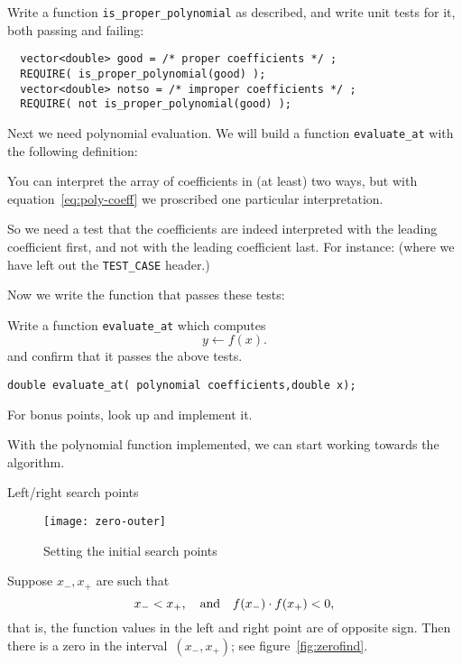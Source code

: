 \begin{exercise}
  \label{ex:proper-poly}
  Write a function \lstinline+is_proper_polynomial+ as described,
  and write unit tests for it, both passing and failing:
\begin{lstlisting}
  vector<double> good = /* proper coefficients */ ;
  REQUIRE( is_proper_polynomial(good) );
  vector<double> notso = /* improper coefficients */ ;
  REQUIRE( not is_proper_polynomial(good) );
\end{lstlisting}
\end{exercise}

Next we need polynomial evaluation.
We will build a function \lstinline{evaluate_at} with the
following definition:

You can interpret the array of coefficients in
(at least) two ways, but with equation~\eqref{eq:poly-coeff}
we proscribed one particular interpretation.

So we need a  test that the coefficients are
indeed interpreted with the leading coefficient first,
and not with the leading coefficient last.
For instance:
%
%
(where we have left out the \lstinline+TEST_CASE+ header.)

Now we write the function that passes these tests:

\begin{exercise}
  \label{ex:bisect-eval}
  Write a function \lstinline+evaluate_at+ which computes
  \[ y \leftarrow f(x) . \]
  and confirm that it passes the above tests.
\begin{lstlisting}
double evaluate_at( polynomial coefficients,double x);
\end{lstlisting}
  For bonus points, look up 
  and implement it.
\end{exercise}

With the polynomial function implemented,
we can start working towards the algorithm.

 {Left/right search points}

\begin{figure}[ht]
  \texttt{[image: zero-outer]}
  \caption{Setting the initial search points}
  \label{fig:zero-outer}
\end{figure}

Suppose $x_-,x_+$ are such that 
\[ x_-<x_+,\quad\hbox{and}\quad f(x_-)\cdot f(x_+)<0,\]
that is, the function values in the left and right point are of opposite sign.
Then there is a zero in the interval~$(x_-,x_+)$;
see figure~\ref{fig:zerofind}.

